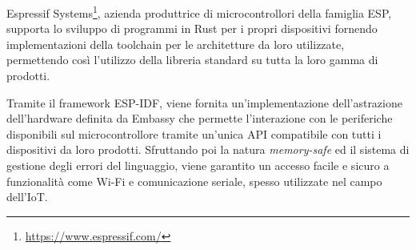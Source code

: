 Espressif Systems\footnote{\url{https://www.espressif.com/}}, azienda produttrice
di microcontrollori della famiglia ESP, supporta lo sviluppo di programmi in Rust
per i propri dispositivi fornendo implementazioni della toolchain per le architetture
da loro utilizzate, permettendo così l'utilizzo della libreria standard su tutta
la loro gamma di prodotti.

Tramite il framework \ac{ESP-IDF}, viene fornita un'implementazione dell'astrazione dell'hardware
definita da Embassy che permette l'interazione con le periferiche disponibili sul
microcontrollore tramite un'unica \ac{API} compatibile con tutti i dispositivi da
loro prodotti. Sfruttando poi la natura \emph{memory-safe} ed il sistema di gestione
degli errori del linguaggio, viene garantito un accesso facile e sicuro
a funzionalità come Wi-Fi e comunicazione seriale, spesso utilizzate nel campo dell'\ac{IoT}.
